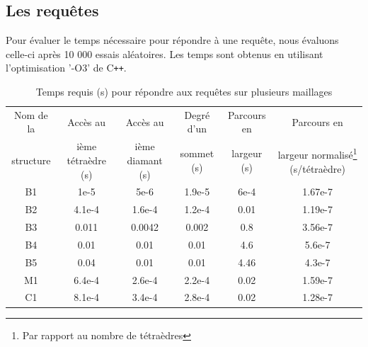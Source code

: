 \subsection{Les requêtes}
\noindent
Pour évaluer le temps nécessaire pour répondre à une requête, nous évaluons celle-ci après 10 000 essais aléatoires. Les temps sont obtenus en utilisant l'optimisation '-O3' de C\texttt{++}.
\begin{table}[h]
\footnotesize
\centering
\begin{tabular}{| c | c | c| c |c |c|}
\hline
Nom de la & Accès au& Accès au & Degré d'un & Parcours en & Parcours en\\
structure &ième tétraèdre (s)& ième diamant (s) &sommet (s)&largeur (s) & largeur normalisé\footnote{Par rapport au nombre de tétraèdres} (s/tétraèdre)\\
\hline
B1  & 1e-5 & 5e-6 & 1.9e-5 & 6e-4& 1.67e-7 \\
B2  &  4.1e-4 & 1.6e-4 & 1.2e-4 & 0.01& 1.19e-7\\
B3 & 0.011 & 0.0042 & 0.002 & 0.8&3.56e-7\\
B4 & 0.01 & 0.01 & 0.01 & 4.6&5.6e-7\\
B5 & 0.04 & 0.01 & 0.01 & 4.46& 4.3e-7 \\
M1  & 6.4e-4 & 2.6e-4 & 2.2e-4 & 0.02&1.59e-7\\
C1  & 8.1e-4 & 3.4e-4 & 2.8e-4 & 0.02&1.28e-7\\
\hline  
\end{tabular}
\label{table:results_time}
\caption{Temps requis (s) pour répondre aux requêtes sur plusieurs maillages}
\end{table}
\noindent


